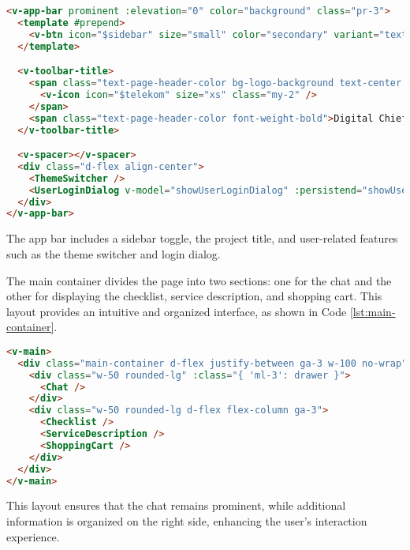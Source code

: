 \begin{lstlisting}[language=HTML, caption={Setting Up the App Bar (\texttt{index.vue})},
  firstnumber=17,label={lst:app-bar}]
<v-app-bar prominent :elevation="0" color="background" class="pr-3">
  <template #prepend>
    <v-btn icon="$sidebar" size="small" color="secondary" variant="text" @click.stop="drawer = !drawer" />
  </template>

  <v-toolbar-title>
    <span class="text-page-header-color bg-logo-background text-center pa-2 mr-4">
      <v-icon icon="$telekom" size="xs" class="my-2" />
    </span>
    <span class="text-page-header-color font-weight-bold">Digital Chief Procurement Officer</span>
  </v-toolbar-title>

  <v-spacer></v-spacer>
  <div class="d-flex align-center">
    <ThemeSwitcher />
    <UserLoginDialog v-model="showUserLoginDialog" :persistend="showUserLoginDialogPersistend" />
  </div>
</v-app-bar>
\end{lstlisting}

The app bar includes a sidebar toggle, the project title, and user-related features such as the theme switcher
and login dialog.

The main container divides the page into two sections: one for the chat and the other for displaying the checklist,
service description, and shopping cart. This layout provides an intuitive and organized interface, as shown in Code
\ref{lst:main-container}.

\begin{lstlisting}[language=HTML, caption={Main Container Layout (\texttt{index.vue})},
  firstnumber=49,label={lst:main-container}]
<v-main>
  <div class="main-container d-flex justify-between ga-3 w-100 no-wrap">
    <div class="w-50 rounded-lg" :class="{ 'ml-3': drawer }">
      <Chat />
    </div>
    <div class="w-50 rounded-lg d-flex flex-column ga-3">
      <Checklist />
      <ServiceDescription />
      <ShoppingCart />
    </div>
  </div>
</v-main>
\end{lstlisting}

This layout ensures that the chat remains prominent, while additional information is organized on the right side,
enhancing the user’s interaction experience.
